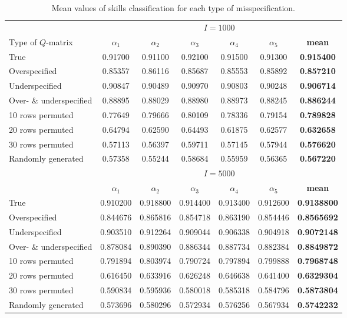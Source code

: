 \documentclass[english]{pwr_wmat_praca_dyplomowa}
\theoremstyle{plain}
\numberwithin{theorem}{chapter}
\theoremstyle{definition}
\numberwithin{theorem}{chapter}
\begin{document}
	\begin{table}
		\centering
		\begin{tabular}{l c c c c c c} 
			\hline
			{\rule{0pt}{3ex}} & \multicolumn{6}{c}{$I=1000$} \\ 
			Type of $Q$-matrix & $\alpha_1$ & $\alpha_2$ & $\alpha_3$ & $\alpha_4$ & $\alpha_5$ & \textbf{mean} \\ [0.5ex]
			\hline 
			{\rule{0pt}{3ex}}True & 0.91700 & 0.91100 & 0.92100 & 0.91500 & 0.91300 & \textbf{0.915400} \\
			Overspecified & 0.85357 & 0.86116 & 0.85687 & 0.85553 & 0.85892 & \textbf{0.857210} \\  
			Underspecified & 0.90847 & 0.90489 & 0.90970 & 0.90803 & 0.90248 & \textbf{0.906714} \\
			Over- \& underspecified & 0.88895 & 0.88029 & 0.88980 & 0.88973 & 0.88245 & \textbf{0.886244}\\
			10 rows permuted & 0.77649 & 0.79666 & 0.80109 & 0.78336 & 0.79154 & \textbf{0.789828} \\
			20 rows permuted & 0.64794 & 0.62590 & 0.64493 & 0.61875 & 0.62577 & \textbf{0.632658} \\
			30 rows permuted & 0.57113 & 0.56397 & 0.59711 & 0.57145 & 0.57944 & \textbf{0.576620} \\
			Randomly generated & 0.57358 & 0.55244 & 0.58684 & 0.55959 & 0.56365 & \textbf{0.567220}\\ [0.5ex] 
			\hline
			{\rule{0pt}{3ex}} & \multicolumn{6}{c}{$I=5000$} \\ 
			& $\alpha_1$ & $\alpha_2$ & $\alpha_3$ & $\alpha_4$ & $\alpha_5$ & \textbf{mean} \\ [0.5ex]
			\hline 
			{\rule{0pt}{3ex}}True & 0.910200 & 0.918800 & 0.914400 & 0.913400 & 0.912600 & \textbf{0.9138800} \\
			Overspecified & 0.844676 & 0.865816 & 0.854718 & 0.863190 & 0.854446 & \textbf{0.8565692} \\  
			Underspecified & 0.903510 & 0.912264 & 0.909044 & 0.906338 & 0.904918 & \textbf{0.9072148} \\
			Over- \& underspecified & 0.878084 & 0.890390 & 0.886344 & 0.887734 & 0.882384 & \textbf{0.8849872}\\
			10 rows permuted & 0.791894 & 0.803974 & 0.790724 & 0.797894 & 0.799888 & \textbf{0.7968748}\\
			20 rows permuted & 0.616450 & 0.633916 & 0.626248 & 0.646638 & 0.641400 & \textbf{0.6329304}\\
			30 rows permuted & 0.590834 & 0.595936 & 0.580018 & 0.585318 & 0.584796 & \textbf{0.5873804}\\
			Randomly generated & 0.573696 & 0.580296 & 0.572934 & 0.576256 & 0.567934 & \textbf{0.5742232}\\ [0.5ex]   
			\hline
		\end{tabular}
		\caption{Mean values of skills classification for each type of misspecification.}
		\label{tab:estimation_skills_qmat} 
	\end{table}
	
\end{document}
